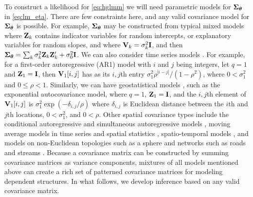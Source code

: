 \documentclass[12pt, titlepage]{article}
\begin{document}
To construct a likelihood for \eqref{eq:hglmm} we will need parametric models for $\mbox{\boldmath $\Sigma$}_{\boldsymbol{\theta}}$ in \eqref{eq:lm_eta}.  There are few constraints here, and any valid covariance model for $\mbox{\boldmath $\Sigma$}_{\boldsymbol{\theta}}$ is possible. For example, $\mbox{\boldmath $\Sigma$}_{\boldsymbol{\theta}}$ may be constructed from typical mixed models where $\mathbf{Z}_{k}$ contains indicator variables for random intercepts, or explanatory variables for random slopes, and where $\mathbf{V}_{k} = \sigma_{k}^{2}\mathbf{I}$, and then $\mbox{\boldmath $\Sigma$}_{\boldsymbol{\theta}} = \sum_{k}\sigma^{2}_{k}\mathbf{Z}_{k}\mathbf{Z}_{k}^{\prime} + \sigma^{2}_{0}\mathbf{I}$. We can also consider time series models \citep[e.g.,][]{Hamilton1994TimeSeriesAnalysis}.  For example, for a first-order autoregressive (AR1) model with $i$ and $j$ being integers, let $q = 1$ and $\mathbf{Z}_{1} = \mathbf{I}$, then $\mathbf{V}_{1}[i,j]$ has as its $i,j$th entry $\sigma_{1}^{2}\rho^{|i-j|}/(1 - \rho^{2})$, where $0 < \sigma^{2}_{1} $ and $0 \le \rho < 1$. Similarly, we can have geostatistical models \citep[][e.g.,]{ChilesEtAl1999GeostatisticsModelingSpatial}, such as the exponential autocovariance model, where $q = 1$, $\mathbf{Z}_{1} = \mathbf{I}$, and the $i,j$th element of $\mathbf{V}_{1}[i,j]$ is $\sigma^{2}_{1}\exp(-\delta_{i,j}/\rho)$ where $\delta_{i,j}$ is Euclidean distance between the $i$th and $j$th locations, $0 < \sigma^{2}_{1}$, and $0 < \rho$.  Other spatial covariance types include the conditional autoregressive \citep[CAR, ][]{Besag1974SpatialInteractionStatistical192,Cressie1993StatisticsSpatialData} and simultaneous autoregressive models \citep[SAR, ][]{Whittle1954stationaryprocessesplane434,VerHoefEtAl2018Spatialautoregressivemodels36}, moving average models in time series \citep[e.g.,][]{Hamilton1994TimeSeriesAnalysis} and spatial statistics \citep{haining_moving_1978}, spatio-temporal models \citep[][p. 380]{CressieEtAl2011StatisticsSpatiotemporalData}, and models on non-Euclidean topologies such as a sphere \citep[e.g., the earth,][]{huang_validity_2011,gneiting_strictly_2013} and networks such as roads \citep{VerHoef2018KrigingModelsLinear1600} and streams \citep{VerHoefEtAl2010movingaverageapproach6}. Because a covariance matrix can be constructed by summing covariance matrices as variance components, mixtures of all models mentioned above can create a rich set of patterned covariance matrices for modeling dependent structures.  In what follows, we develop inference based on any valid covariance matrix. 

\end{document}
